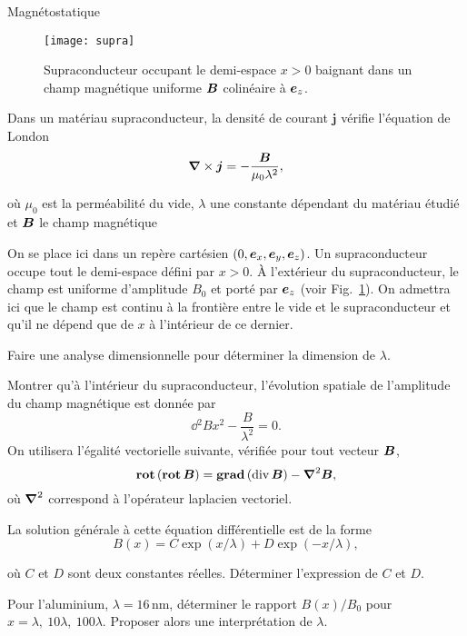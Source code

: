 \begin{td}{Magnétostatique}
\begin{figure}[h]
	\centering
	\texttt{[image: supra]}
	\caption{Supraconducteur occupant le demi-espace $x > 0$ baignant dans
	un champ magnétique uniforme $\vecb$ colinéaire à $\ez$.}%
	\label{fig:supra}
\end{figure}

	Dans un matériau supraconducteur, la densité de courant $\mathbf{j}$ 
	vérifie l'équation de London 
\begin{equation*}
	\grad \times \vecj = -\frac{\vecb}{\mu_0 \lambda^2},
\end{equation*} 

où $\mu_0$ est la perméabilité du vide, $\lambda$ une constante dépendant du 
matériau étudié et $\vecb$ le champ magnétique

On se place ici dans un repère cartésien $(0,\ex,\ey,\ez)$. 
Un supraconducteur occupe tout le demi-espace défini par $x > 0$.
À l'extérieur du supraconducteur, le champ est uniforme d'amplitude $B_0$ et 
porté par $\ez$ (voir Fig.~\ref{fig:supra}).
On admettra ici que le champ est continu à la frontière entre le vide et le 
supraconducteur et qu'il ne dépend que de $x$ à l'intérieur de ce dernier.

\begin{exlist}
	\item Faire une analyse dimensionnelle pour déterminer la dimension de $\lambda$.
	\item Montrer qu'à l'intérieur du supraconducteur, 
	  l'évolution spatiale de l'amplitude du  champ magnétique est donnée par 
		\begin{equation*}
			\dd{^2B}{x^2} - \frac{B}{\lambda^2} = 0.
		\end{equation*}
	On utilisera l'égalité vectorielle suivante, vérifiée pour tout 
	vecteur $\vecb$,
	\begin{equation*} 
		\rot(\rot \vecb) = \gradient(\div\vecb) - \laplacien \vecb,
	\end{equation*}
	où $\laplacien$ correspond à l'opérateur laplacien vectoriel.
	\item La solution générale à cette équation différentielle est de la forme 
\begin{equation}
	B(x) = C \exp(x/\lambda) + D \exp(-x/\lambda),
\end{equation}

où $C$ et $D$ sont deux constantes réelles.
Déterminer l'expression de $C$ et $D$.

\item Pour l'aluminium, $\lambda = 16$\,nm, déterminer le rapport $B(x)/B_0$ pour $x = \lambda,\ 10\lambda,\ 100\lambda$. Proposer alors une interprétation de $\lambda$.
\end{exlist}


\end{td}
